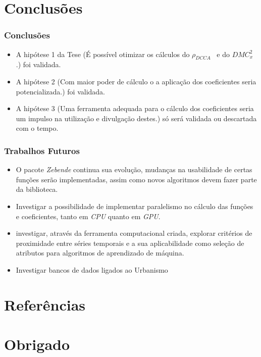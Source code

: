 \documentclass[11pt, aspectratio=169]{beamer}
\newcommand{\dmc}{\(DMC_x^2\) }
\newcommand{\pdcca}{\({\rho}_{DCCA}\) }
\begin{document}
\section{Conclusões}

\begin{frame}
  \frametitle{Conclusões}

  \begin{itemize}
    \item A hipótese 1 da Tese (É possível otimizar os cálculos do \pdcca~e do \dmc.) foi validada.
    \item A hipótese 2 (Com maior poder de cálculo o a aplicação dos coeficientes seria potencializada.) foi validada.
    \item A hipótese 3 (Uma ferramenta adequada para o cálculo dos coeficientes seria um impulso na utilização e divulgação destes.) só será validada ou descartada com o tempo.
  \end{itemize}

\end{frame}

\begin{frame}
  \frametitle{Trabalhos Futuros}
  \begin{itemize}
    \item O pacote \emph{Zebende} continua sua evolução, mudanças na usabilidade de certas funções serão implementadas, assim como novos algoritmos devem fazer parte da biblioteca.
    \item   Investigar a possibilidade de implementar paralelismo no cálculo das funções e coeficientes, tanto em \emph{CPU} quanto em \emph{GPU}.
    \item investigar, através da ferramenta computacional criada, explorar critérios de proximidade entre séries temporais e a sua aplicabilidade como seleção de atributos para algoritmos de aprendizado de máquina.
    \item Investigar bancos de dados ligados ao Urbanismo
  \end{itemize}
\end{frame}


\section{Referências}

\begin{frame}[allowframebreaks]

  

\end{frame}

\section*{Obrigado}
\end{document}
